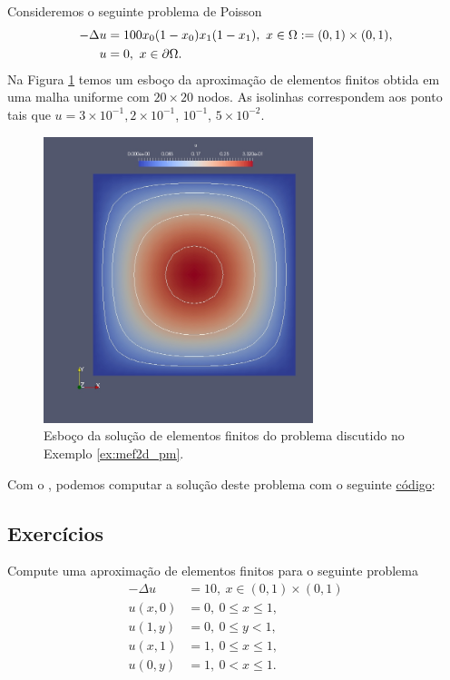 \begin{ex}\label{ex:mef2d_pm}
  Consideremos o seguinte problema de Poisson
  \begin{align}
    -\Delta u &= 100x_0(1-x_0)x_1(1-x_1),~x\in\Omega:=(0, 1)\times (0, 1),\\
    u &= 0,~x\in\partial\Omega.
  \end{align}
  Na Figura \ref{fig:mef2d_pm} temos um esboço da aproximação de elementos finitos obtida em uma malha uniforme com $20\times 20$ nodos. As isolinhas correspondem aos ponto tais que $u=3\times 10^{-1}, 2\times 10^{-1}$, $10^{-1}$, $5\times 10^{-2}$.

  \begin{figure}[h!]
    \centering
    \includegraphics[width=0.7\textwidth]{./cap_mef2d/dados/ex_mef2d_pm/fig_mef2d_pm}
    \caption{Esboço da solução de elementos finitos do problema discutido no Exemplo \ref{ex:mef2d_pm}.}
    \label{fig:mef2d_pm}
  \end{figure}

\ifispython
Com o \fenics, podemos computar a solução deste problema com o seguinte \href{https://github.com/phkonzen/notas/blob/master/src/MetodoElementosFinitos/cap_mef2d/dados/ex_mef2d_pm/ex_mef2d_pm.py}{código}:

\fi
\end{ex}

\subsection{Exercícios}
\badgeRevisar

\begin{exer}
  Compute uma aproximação de elementos finitos para o seguinte problema
\begin{align}
  -\Delta u &= 10,~x\in (0, 1)\times (0, 1)\\
  u(x,0) &= 0,~0\leq x \leq 1,\\
  u(1,y) &= 0,~0\leq y < 1,\\
  u(x,1) &= 1,~0\leq x \leq 1,\\
  u(0,y) &= 1,~0<x\leq 1.
\end{align}
\end{exer}

